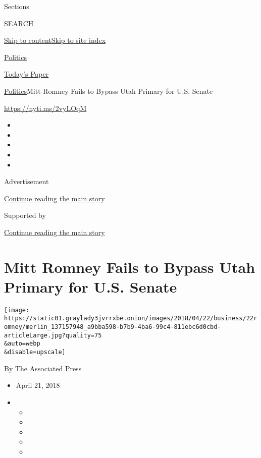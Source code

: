 Sections

SEARCH

\protect\hyperlink{site-content}{Skip to
content}\protect\hyperlink{site-index}{Skip to site index}

\href{https://www.nytimes3xbfgragh.onion/section/politics}{Politics}

\href{https://myaccount.nytimes3xbfgragh.onion/auth/login?response_type=cookie\&client_id=vi}{}

\href{https://www.nytimes3xbfgragh.onion/section/todayspaper}{Today's
Paper}

\href{/section/politics}{Politics}\textbar{}Mitt Romney Fails to Bypass
Utah Primary for U.S. Senate

\url{https://nyti.ms/2vyLOqM}

\begin{itemize}
\item
\item
\item
\item
\item
\end{itemize}

Advertisement

\protect\hyperlink{after-top}{Continue reading the main story}

Supported by

\protect\hyperlink{after-sponsor}{Continue reading the main story}

\hypertarget{mitt-romney-fails-to-bypass-utah-primary-for-us-senate}{%
\section{Mitt Romney Fails to Bypass Utah Primary for U.S.
Senate}\label{mitt-romney-fails-to-bypass-utah-primary-for-us-senate}}

\texttt{[image: https://static01.graylady3jvrrxbe.onion/images/2018/04/22/business/22romney/merlin\_137157948\_a9bba598-b7b9-4ba6-99c4-811ebc6d0cbd-articleLarge.jpg?quality=75\\\&auto=webp\\\&disable=upscale]}

By The Associated Press

\begin{itemize}
\item
  April 21, 2018
\item
  \begin{itemize}
  \item
  \item
  \item
  \item
  \item
  \end{itemize}
\end{itemize}

